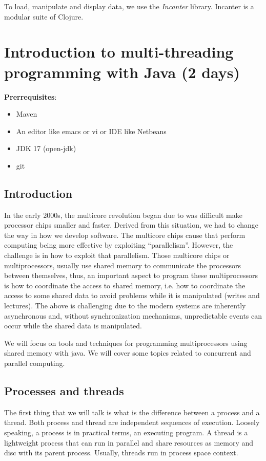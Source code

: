 \documentclass[openany, a4paper]{book}
\theoremstyle{break}
\theoremstyle{example}
\theoremstyle{note}
\theoremstyle{break}
\theoremstyle{exercise}
\begin{document}
To load, manipulate and display data, we use the \emph{Incanter} library. Incanter
is a modular suite of Clojure.


\chapter{Introduction to multi-threading programming with Java (2 days)}
\label{sec:org986155c}
\textbf{Prerrequisites}:
\begin{itemize}
\item Maven
\item An editor like emacs or vi or IDE like Netbeans
\item JDK 17 (open-jdk)
\item git
\end{itemize}

\section{Introduction}
\label{sec:orgec7de87}

In the early 2000s, the multicore revolution began due to was difficult make
processor chips smaller and faster. Derived from this situation, we had to
change the way in how we develop software. The multicore chips cause that
perform computing being more effective by exploiting
``parallelism''. However, the challenge is in how to exploit that
parallelism. Those multicore chips or multiprocessors, usually use shared
memory to communicate the processors between themselves, thus, an important
aspect to program these multiprocessors is how to coordinate the access to
shared memory, i.e. how to coordinate the access to some shared data to avoid
problems while it is manipulated (writes and lectures). The above is
challenging due to the modern systems are inherently asynchronous and,
without synchronization mechanisms, unpredictable events can occur while the
shared data is manipulated.

We will focus on tools and techniques for programming multiprocessors using
shared memory with java. We will cover some topics related to concurrent and
parallel computing.


\section{Processes and threads}
\label{sec:orgc8367ec}

The first thing that we will talk is what is the difference between a process
and a thread. Both process and thread are independent sequences of
execution. Loosely speaking, a process is in practical terms, an executing
program. A thread is a lightweight process that can run in parallel and share
resources as memory and disc with its parent process. Usually, threads run in
process space context.
\end{document}
